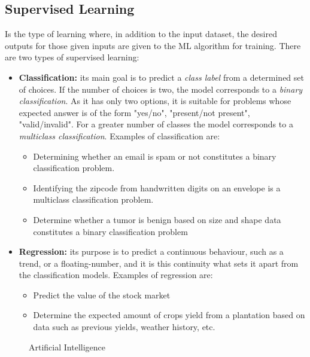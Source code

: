 \subsection{Supervised Learning}
Is the type of learning where, in addition to the input dataset, the desired outputs for those given inputs are given to the \ac{ML} algorithm for training. There are two types of supervised learning:
\begin{itemize}
    \item \textbf{Classification:} its main goal is to predict a \emph{class label} from a determined set of choices. If the number of choices is two, the model corresponds to a \emph{binary classification}. As it has only two options, it is suitable for problems whose expected answer is of the form "yes/no", "present/not present", "valid/invalid". For a greater number of classes the model corresponds to a \emph{multiclass classification}. Examples of classification are:
        \begin{itemize}
            \item Determining whether an email is spam or not constitutes a binary classification problem.
            \item Identifying the zipcode from handwritten digits on an envelope is a multiclass classification problem.
            \item Determine whether a tumor is benign based on size and shape data constitutes a binary classification problem
        \end{itemize}
    \item \textbf{Regression:} its purpose is to predict a continuous behaviour, such as a trend, or a floating-number, and it is this continuity what sets it apart from the classification models. Examples of regression are:
        \begin{itemize}
            \item Predict the value of the stock market
            \item Determine the expected amount of crops yield from a plantation based on data such as previous yields, weather history, etc.
        \end{itemize}
\end{itemize}

\begin{figure}[htb]
    \centering
      
      \caption{Artificial Intelligence}
      \label{fig:knn_accs}
\end{figure}


